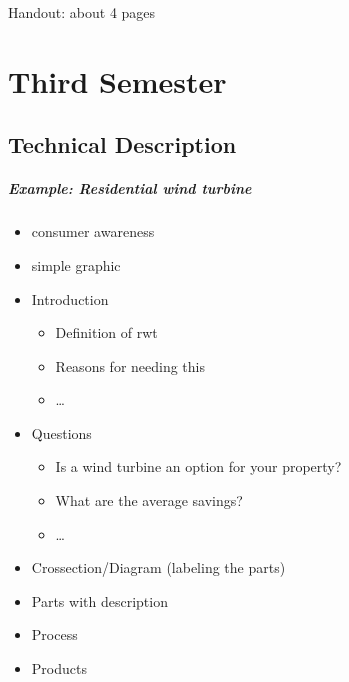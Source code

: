 \documentclass{scrreprt}
\begin{document}
Handout: about 4 pages

\chapter{Third Semester}

\section{Technical Description}
\paragraph{Example: Residential wind turbine}
\begin{itemize}
\item consumer awareness
\item simple graphic
\item Introduction
\begin{itemize}
\item Definition of rwt
\item Reasons for needing this
\item …
\end{itemize}
\item Questions
\begin{itemize}
\item Is a wind turbine an option for your property?
\item What are the average savings?
\item …
\end{itemize}
\item Crossection/Diagram (labeling the parts)
\item Parts with description
\item Process
\item Products
\end{itemize}
\end{document}
